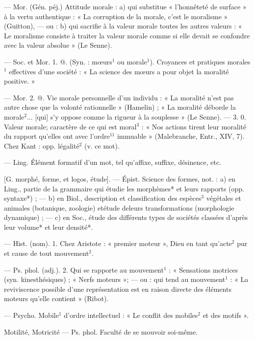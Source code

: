 \begin{itemize}[leftmargin=1cm, label=, itemsep=1pt]
 — Mor. (Gén. péj.) Attitude morale : a) qui substitue « l’honnêteté de surface » à la vertu authentique : « La corruption de la morale,
c'est le moralisme » (Guitton), —
ou : b) qui sacrifie à la valeur morale
toutes les autres valeurs : « Le moralisme consiste à traiter la valeur
morale comme si elle devait se confondre avec la valeur absolue » (Le
Senne).

 — Soc. et Mor. 1. @. (Syn. :
mœurs$^1$ ou morale$^1$). Croyances et
pratiques morales$^1$ effectives d’une
société : « La science des mœurs a
pour objet la moralité positive. »

— Mor. 2. @. Vie morale personnelle d’un individu : « La moralité n’est pas autre chose que la volonté rationnelle » (Hamelin) ; « La
moralité déborde la morale$^2$... [qui]
s’y oppose comme la rigueur à la
souplesse » (Le Senne). — 3. 0.
Valeur morale; caractère de ce qui
est moral$^3$ : « Nos actions tirent leur
moralité du rapport qu’elles ont
avec l’ordre$^{11}$ immuable » (Malebranche, Entr., XIV, 7). Chez Kant :
opp. légalité$^2$ (v. ce mot).

 — Ling. Élément formatif
d'un mot, tel qu'affixe, suffixe,
désinence, etc.

 [G. morphé, forme, et
logos, étude]. — Épist. Science des
formes, not. : a) en Ling., partie de
la grammaire qui étudie les morphèmes* et leurs rapports (opp.
syntaxe*) ; — b) en Biol., description et classification des espèces$^3$
végétales et animales (botanique,
zoologie) etétude deleurs transformations (morphologie dynamique) ; —
c) en Soc., étude des différents types
de sociétés classées d’après leur
volume* et leur densité*.

 — Hist. (nom). 1. Chez Aristote : « premier moteur », Dieu en
tant qu'acte$^2$ pur et cause de tout
mouvement$^2$.

— Ps. phol. (adj.). 2. Qui se rapporte au mouvement$^1$ : « Sensations
motrices (syn. kinesthésiques) ;
« Nerfs moteurs »; — ou : qui tend
au mouvement$^1$ : « La reviviscence
possible d’une représentation est
en raison directe des éléments moteurs qu’elle contient » (Ribot).

 — Psycho. Mobile$^1$ d'ordre intellectuel : « Le conflit des mobiles$^2$ et
des motifs ».

Motilité, Motricité\ib{} — Ps. phol. Faculté
de se mouvoir soi-même.


\end{itemize}
